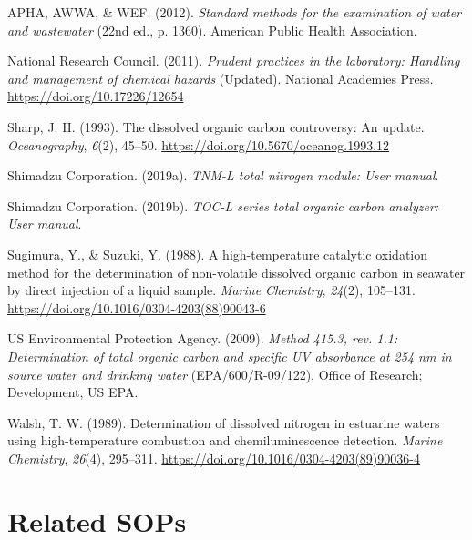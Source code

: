 \documentclass[
  11pt,
  letterpaper,
]{article}
\newlength{\cslhangindent}
\newenvironment{CSLReferences}[2] %
 {\begin{list}{}{%
  \setlength{\itemindent}{0pt}
  \setlength{\leftmargin}{0pt}
  \setlength{\parsep}{0pt}
  \ifodd #1
   \setlength{\leftmargin}{\cslhangindent}
   \setlength{\itemindent}{-1\cslhangindent}
  \fi
  \setlength{\itemsep}{#2\baselineskip}}}
 {\end{list}}
\begin{document}
\protect{}\label{refs}
\begin{CSLReferences}{1}{0}
APHA, AWWA, \& WEF. (2012). \emph{Standard methods for the examination
of water and wastewater} (22nd ed., p. 1360). American Public Health
Association.

National Research Council. (2011). \emph{Prudent practices in the
laboratory: Handling and management of chemical hazards} (Updated).
National Academies Press. \url{https://doi.org/10.17226/12654}

Sharp, J. H. (1993). The dissolved organic carbon controversy: An
update. \emph{Oceanography}, \emph{6}(2), 45--50.
\url{https://doi.org/10.5670/oceanog.1993.12}

Shimadzu Corporation. (2019a). \emph{{TNM-L} total nitrogen module: User
manual}.

Shimadzu Corporation. (2019b). \emph{{TOC-L} series total organic carbon
analyzer: User manual}.

Sugimura, Y., \& Suzuki, Y. (1988). A high-temperature catalytic
oxidation method for the determination of non-volatile dissolved organic
carbon in seawater by direct injection of a liquid sample. \emph{Marine
Chemistry}, \emph{24}(2), 105--131.
\url{https://doi.org/10.1016/0304-4203(88)90043-6}

US Environmental Protection Agency. (2009). \emph{Method 415.3, rev.
1.1: Determination of total organic carbon and specific UV absorbance at
254 nm in source water and drinking water} (EPA/600/R-09/122). Office of
Research; Development, US EPA.

Walsh, T. W. (1989). Determination of dissolved nitrogen in estuarine
waters using high-temperature combustion and chemiluminescence
detection. \emph{Marine Chemistry}, \emph{26}(4), 295--311.
\url{https://doi.org/10.1016/0304-4203(89)90036-4}

\end{CSLReferences}

\section{Related SOPs}\label{related-sops}
\end{document}
